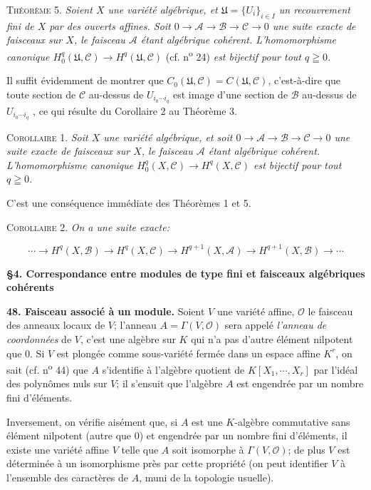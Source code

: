 \textsc{Théorème} 5. \textit{Soient $X$ une variété algébrique, et $\mathfrak{U} = \{U_i\}_{i \in I}$ un recouvrement}
\textit{fini de $X$ par des ouverts affines. Soit $0 \to \mathcal{A} \to \mathcal{B} \to \mathcal{C} \to 0$ une suite exacte de faisceaux sur $X$, le faisceau $\mathcal{A}$ étant algébrique cohérent. L'homomorphisme canonique $H^q_0(\mathfrak{U}, \mathcal{C}) \to H^q(\mathfrak{U}, \mathcal{C})$} (cf. n\textsuperscript{o} 24) \textit{est bijectif pour tout $q \geqq 0$.}

Il suffit évidemment de montrer que $C_0(\mathfrak{U}, \mathcal{C}) = C(\mathfrak{U}, \mathcal{C})$, c'est-à-dire que toute section de $\mathcal{C}$ au-dessus de $U_{i_0 \cdots i_q}$ est image d'une section de $\mathcal{B}$ au-dessus de $U_{i_0 \cdots i_q}$ , ce qui résulte du Corollaire 2 au Théorème 3.

\textsc{Corollaire} 1. \textit{Soit $X$ une variété algébrique, et soit $0 \to \mathcal{A} \to \mathcal{B} \to \mathcal{C} \to 0$ une suite exacte de faisceaux sur $X$, le faisceau $\mathcal{A}$ étant algébrique cohérent. L'homomorphisme canonique $H^q_0(X, \mathcal{C}) \to H^q(X, \mathcal{C})$ est bijectif pour tout $q \geqq 0$.}

C'est une conséquence immédiate des Théorèmes 1 et 5.

\textsc{Corollaire} 2. \textit{On a une suite exacte:}

\begin{equation*}
\cdots \to H^q(X, \mathcal{B}) \to H^q(X, \mathcal{C}) \to H^{q+1}(X, \mathcal{A}) \to H^{q+1}(X, \mathcal{B}) \to \cdots
\end{equation*}

\textbf{§4. Correspondance entre modules de type fini et faisceaux algébriques cohérents}

\textbf{48. Faisceau associé à un module.} Soient $V$ une variété affine, $\mathcal{O}$ le faisceau des anneaux locaux de $V$; l'anneau $A = \Gamma(V, \mathcal{O})$ sera appelé \textit{l'anneau de coordonnées} de $V$, c'est une algèbre sur $K$ qui n'a pas d'autre élément nilpotent que 0. Si $V$ est plongée comme sous-variété fermée dans un espace affine $K^r$, on sait (cf. n\textsuperscript{o} 44) que $A$ s'identifie à l'algèbre quotient de $K[X_1 , \cdots , X_r]$ par l'idéal des polynômes nuls sur $V$; il s'ensuit que l'algèbre $A$ est engendrée par un nombre fini d'éléments.

Inversement, on vérifie aisément que, si $A$ est une $K$-algèbre commutative sans élément nilpotent (autre que 0) et engendrée par un nombre fini d'éléments, il existe une variété affine $V$ telle que $A$ soit isomorphe à $\Gamma(V, \mathcal{O})$; de plus $V$ est déterminée à un isomorphisme près par cette propriété (on peut identifier $V$ à l'ensemble des caractères de $A$, muni de la topologie usuelle).

